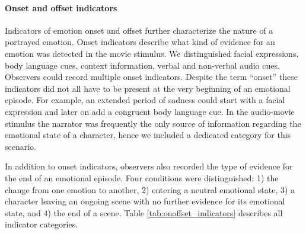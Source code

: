 \paragraph{Onset and offset indicators}

Indicators of emotion onset and offset further characterize the nature of a
portrayed emotion. Onset indicators describe what kind of evidence for an
emotion was detected in the movie stimulus. We distinguished facial
expressions, body language cues, context information, verbal and non-verbal
audio cues. Observers could record multiple onset indicators. Despite the term
``onset'' these indicators did not all have to be present at the very beginning
of an emotional episode. For example, an extended period of sadness could start
with a facial expression and later on add a congruent body language cue.  In
the audio-movie stimulus the narrator was frequently the only source of
information regarding the emotional state of a character, hence we included a
dedicated category for this scenario.

In addition to onset indicators, observers also recorded the type of evidence
for the end of an emotional episode. Four conditions were distinguished: 1) the
change from one emotion to another, 2) entering a neutral emotional state, 3) a
character leaving an ongoing scene with no further evidence for its emotional
state, and 4) the end of a scene.  Table \ref{tab:onoffset_indicators}
describes all indicator categories.

